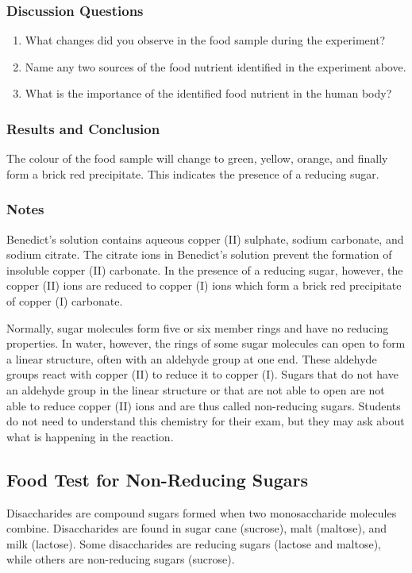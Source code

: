 \subsubsection*{Discussion Questions}
\begin{enumerate}
\item{What changes did you observe in the food sample during the experiment?}
\item{Name any two sources of the food nutrient identified in the experiment above.}
\item{What is the importance of the identified food nutrient in the human body?}
\end{enumerate}

\subsubsection*{Results and Conclusion}
The colour of the food sample will change to green, yellow, orange, and finally form a brick red precipitate. This indicates the presence of a reducing sugar.

\subsubsection*{Notes}
Benedict's solution contains aqueous copper (II) sulphate, sodium carbonate, and sodium citrate. The citrate ions in Benedict's solution prevent the formation of insoluble copper (II) carbonate. In the presence of a reducing sugar, however, the copper (II) ions are reduced to copper (I) ions which form a brick red precipitate of copper (I) carbonate.

Normally, sugar molecules form five or six member rings and have no reducing properties. In water, however, the rings of some sugar molecules can open to form a linear structure, often with an aldehyde group at one end. These aldehyde groups react with copper (II) to reduce it to copper (I). Sugars that do not have an aldehyde group in the linear structure or that are not able to open are not able to reduce copper (II) ions and are thus called non-reducing sugars. Students do not need to understand this chemistry for their exam, but they may ask about what is happening in the reaction.

\subsection{Food Test for Non-Reducing Sugars}
Disaccharides are compound sugars formed when two monosaccharide molecules combine. Disaccharides are found in sugar cane (sucrose), malt (maltose), and milk (lactose). Some disaccharides are reducing sugars (lactose and maltose), while others are non-reducing sugars (sucrose).

